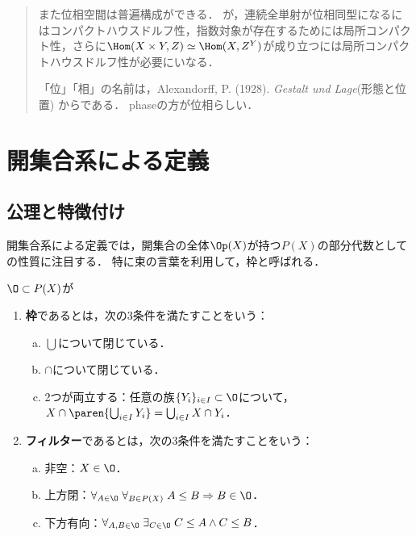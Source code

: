 \documentclass[uplatex,dvipdfmx]{jsreport}
\begin{document}
\begin{quotation}
    また位相空間は普遍構成ができる．
    が，連続全単射が位相同型になるにはコンパクトハウスドルフ性，指数対象が存在するためには局所コンパクト性，さらに$\Hom(X\times Y,Z)\simeq\Hom(X,Z^Y)$が成り立つには局所コンパクトハウスドルフ性が必要にいなる．

    「位」「相」の名前は，Alexandorff, P. (1928). \textit{Gestalt und Lage}(形態と位置) からである．
    phaseの方が位相らしい．
\end{quotation}

\section{開集合系による定義}

\subsection{公理と特徴付け}

\begin{tcolorbox}[colframe=ForestGreen, colback=ForestGreen!10!white,breakable,colbacktitle=ForestGreen!40!white,coltitle=black,fonttitle=\bfseries\sffamily,
title=]
    開集合系による定義では，開集合の全体$\Op(X)$が持つ$P(X)$の部分代数としての性質に注目する．
    特に束の言葉を利用して，枠と呼ばれる．
\end{tcolorbox}

\begin{definition}
    $\O\subset P(X)$が
    \begin{enumerate}
        \item \textbf{枠}であるとは，次の3条件を満たすことをいう：
        \begin{enumerate}[(a)]
            \item $\bigcup$について閉じている．
            \item $\cap$について閉じている．
            \item 2つが両立する：任意の族$\{Y_i\}_{i\in I}\subset\O$について，$X\cap\paren{\bigcup_{i\in I}Y_i}=\bigcup_{i\in I}X\cap Y_i$．
        \end{enumerate}
        \item \textbf{フィルター}であるとは，次の3条件を満たすことをいう：
        \begin{enumerate}[(a)]
            \item 非空：$X\in\O$．
            \item 上方閉：$\forall_{A\in\O}\;\forall_{B\in P(X)}\;A\le B\Rightarrow B\in\O$．
            \item 下方有向：$\forall_{A,B\in\O}\;\exists_{C\in\O}\;C\le A\land C\le B$．
        \end{enumerate}
    \end{enumerate}
\end{definition}
\end{document}
